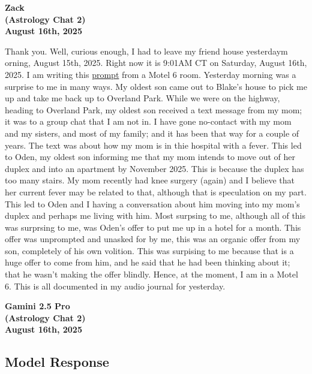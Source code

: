 \documentclass{article}
\begin{document}

\begin{center}
\textbf{Zack} \\
\textbf{(Astrology Chat 2)} \\
\textbf{August 16th, 2025} 
\end{center}

Thank you. Well, curious enough, I had to leave my friend house yesterdaym orning, August 15th, 2025. Right now it is 9:01AM CT on Saturday, August 16th, 2025. I am writing this \hyperlink{gloss:prompt}{prompt} from a Motel 6 room. Yesterday morning was a surprise to me in many ways. My oldest son came out to Blake's house to pick me up and take me back up to Overland Park. While we were on the highway, heading to Overland Park, my oldest son received a text message from my mom; it was to a group chat that I am not in. I have gone no-contact with my mom and my sisters, and most of my family; and it has been that way for a couple of years. The text was about how my mom is in thie hospital with a fever. This led to Oden, my oldest son informing me that my mom intends to move out of her duplex and into an apartment by November 2025. This is because the duplex has too many stairs. My mom recently had knee surgery (again) and I believe that her current fever may be related to that, although that is speculation on my part. This led to Oden and I having a conversation about him moving into my mom's duplex and perhaps me living with him. Most surpsing to me, although all of this was surprsing to me, was Oden's offer to put me up in a hotel for a month. This offer was unprompted and unasked for by me, this was an organic offer from my son, completely of his own volition. This was surpising to me because that is a huge offer to come from him, and he said that he had been thinking about it; that he wasn't making the offer blindly. Hence, at the moment, I am in a Motel 6. This is all documented in my audio journal for yesterday.

\begin{center}
\textbf{Gamini 2.5 Pro} \\
\textbf{(Astrology Chat 2)} \\
\textbf{August 16th, 2025}
\end{center}

\subsection*{Model Response}\label{model-response}
\end{document}
